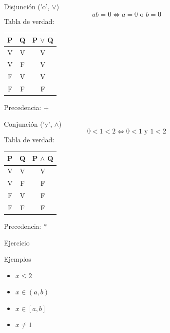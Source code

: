 \documentclass[14pt,aspectratio=169,xcolor=dvipsnames]{beamer}
\begin{document}
\begin{frame}{Disjunción ('o', $\vee$)}
    $$ ab = 0 \Leftrightarrow a=0 \text{ o } b=0 $$
    Tabla de verdad:
        \begin{center}
            \begin{tabular}{c c | c}
                \toprule P & Q & P $\vee$ Q \\\midrule
                V & V & V \\
                V & F & V \\
                F & V & V \\
                F & F & F  \\ \bottomrule
            \end{tabular}
        \end{center}

    Precedencia: $+$
\end{frame}
\begin{frame}{Conjunción ('y', $\wedge$)}
    $$ 0<1<2 \Leftrightarrow 0<1 \text{ y } 1<2 $$
    Tabla de verdad:
        \begin{center}
            \begin{tabular}{c c | c}
                \toprule P & Q & P $\wedge$ Q \\\midrule
                V & V & V \\
                V & F & F \\
                F & V & F \\
                F & F & F  \\ \bottomrule
            \end{tabular}
        \end{center}

    Precedencia: $*$
\end{frame}
\begin{frame}{Ejercicio}
    \begin{center}
    \end{center}
\end{frame}
\begin{frame}{Ejemplos}
    \begin{itemize}
        \item $x \leq 2$
        \item $x \in (a,b)$
        \item $x \in [a,b]$
        \item $x\neq 1$
    \end{itemize}
\end{frame}
\end{document}
